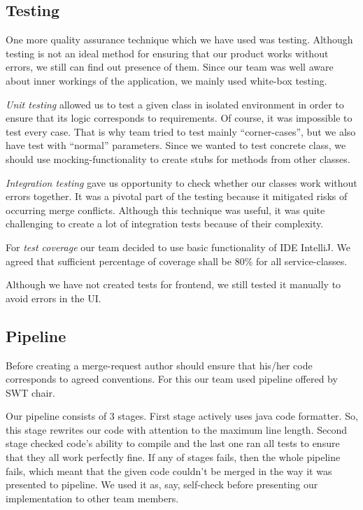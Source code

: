\subsection{Testing}
One more quality assurance technique which we have used was testing. Although testing is not an ideal method for ensuring that our product works without errors, we still can find out presence of them. Since our team was well aware about inner workings of the application, we mainly used white-box testing. 

\emph{Unit testing} allowed us to test a given class in isolated environment in order to ensure that its logic corresponds to requirements. Of course, it was impossible to test every case. That is why team tried to test mainly “corner-cases”, but we also have test with “normal” parameters.  Since we wanted to test concrete class, we should use mocking-functionality to create stubs for methods from other classes.

\emph{Integration testing} gave us opportunity to check whether our classes work without errors together. It was a pivotal part of the testing because it mitigated risks of occurring merge conflicts. Although this technique was useful, it was quite challenging to create a lot of integration tests because of their complexity.

For \emph{test coverage} our team decided to use basic functionality of IDE IntelliJ. We agreed that sufficient percentage of coverage shall be 80\% for all service-classes.

Although we have not created tests for frontend, we still tested it manually to avoid errors in the UI.

\subsection{Pipeline}
Before creating a merge-request author should ensure that his/her code corresponds to agreed conventions. For this our team used pipeline offered by SWT chair. 

Our pipeline consists of 3 stages. First stage actively uses java code formatter. So, this stage rewrites our code with attention to the maximum line length. Second stage checked code’s ability to compile and the last one ran all tests to ensure that they all work perfectly fine. If any of stages fails, then the whole pipeline fails, which meant that the given code couldn’t be merged in the way it was presented to pipeline. We used it as, say, self-check before presenting our implementation to other team members.

